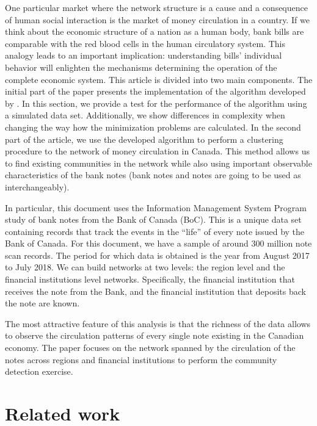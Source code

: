 \documentclass[11pt,letter]{article}%
\numberwithin{equation}{section}
\begin{document}
One particular market where the network structure is a cause and a consequence of human social interaction is the market of money circulation in a country. If we think about the economic structure of a nation as a human body, bank bills are comparable with the red blood cells in the human circulatory system. This analogy leads to an important implication: understanding bills' individual behavior will enlighten the mechanisms determining the operation of the complete economic system. This article is divided into two main components. The initial part of the paper presents the implementation of the algorithm developed by \cite{Du2017b}. In this section, we provide a test for the performance of the algorithm using a simulated data set. Additionally, we show differences in complexity when changing the way how the minimization problems are calculated. In the second part of the article, we use the developed algorithm to perform a clustering procedure to the network of money circulation in Canada. This method allows us to find existing communities in the network while also using important observable characteristics of the bank notes (bank notes and notes are going to be used as interchangeably).

In particular, this document uses the Information Management System Program study of bank notes from the Bank of Canada (BoC). This is a unique data set containing records that track the events in the ``life'' of every note issued by the Bank of Canada. For this document, we have a sample of around 300 million note scan records. The period for which data is obtained is the year from August 2017 to July 2018. We can build networks at two levels:  the region level and the financial institutions level networks. Specifically, the financial institution that receives the note from the Bank, and the financial institution that deposits back the note are known.  

The most attractive feature of this analysis is that the richness of the data allows to observe the circulation patterns of every single note existing in the Canadian economy. The paper focuses on the network spanned by the circulation of the notes across regions and financial institutions to perform the community detection exercise. 


\section{Related work}
\end{document}
